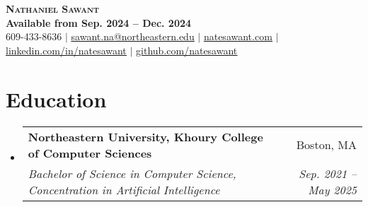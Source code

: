 \documentclass[letterpaper,11pt]{article}
\makeatletter
\newcommand{\resumeSubheading}[4]{
  \vspace{-2pt}\item
    \begin{tabular*}{0.97\textwidth}[t]{l@{\extracolsep{\fill}}r}
      \textbf{#1} & #2 \\
      \textit{\small#3} & \textit{\small #4} \\
    \end{tabular*}\vspace{-7pt}
}
\newcommand{\resumeSubHeadingListStart}{\begin{itemize}[leftmargin=0.15in, label={}]}
\newcommand{\resumeSubHeadingListEnd}{\end{itemize}}
\makeatother
\begin{document}

\begin{center}
  \textbf{\Huge \scshape Nathaniel Sawant} \\ \vspace{1pt}
  \textbf{Available from Sep. 2024 -- Dec. 2024} \\ \vspace{1pt}
  \small 609-433-8636 $|$ \href{mailto:sawant.na@northeastern.edu}{\underline{sawant.na@northeastern.edu}} $|$
  \href{https://natesawant.com}{\underline{natesawant.com}} $|$
  \href{https://linkedin.com/in/natesawant}{\underline{linkedin.com/in/natesawant}} $|$
  \href{https://github.com/natesawant}{\underline{github.com/natesawant}}
\end{center}


\section{Education}
\resumeSubHeadingListStart
\resumeSubheading
{Northeastern University, Khoury College of Computer Sciences}{Boston, MA}
{Bachelor of Science in Computer Science, Concentration in Artificial Intelligence}{Sep. 2021 -- May 2025}
\resumeSubHeadingListEnd
\end{document}
